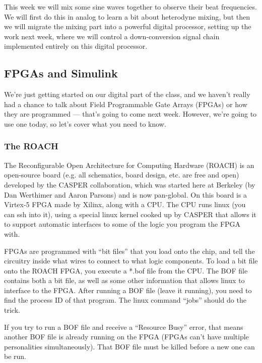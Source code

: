 \documentclass[11pt]{article}
\begin{document}
This week we will mix some sine waves together to observe their beat frequencies.  We will first do this
in analog to learn a bit about heterodyne mixing, but then we will migrate the mixing part into a powerful
digital processor, setting up the work next week, where we will control a down-conversion signal
chain implemented entirely on this digital processor.

\subsection*{FPGAs and Simulink}

We're just getting started on our digital part of the class, and we haven't really had a chance to talk
about Field Programmable Gate Arrays (FPGAs) or how they are programmed --- that's going to come next
week.  However, we're going to use one today, so let's cover what you need to know.

\subsubsection*{The ROACH}

The Reconfigurable Open Architecture for Computing Hardware (ROACH) is an open-source board (e.g.
all schematics, board design, etc. are free and open) developed by the CASPER collaboration, which
was started here at Berkeley (by Dan Werthimer and Aaron Parsons) and is now pan-global.  
On this board is a Virtex-5 FPGA made by Xilinx, along with a CPU.  The CPU
runs linux (you can ssh into it), using a special linux kernel cooked up by CASPER that allows it to support 
automatic interfaces to some of the logic you program the FPGA with.

FPGAs are programmed with ``bit files'' that you load onto the chip, and tell the circuitry inside what
wires to connect to what logic components.  To load a bit file onto the ROACH FPGA, you execute a *.bof file
from the CPU.  The BOF file contains both a bit file, as well as some other information that allows
linux to interface to the FPGA.  After running a BOF file (leave it running), you need to find the 
process ID of that program.  The linux command ``jobs'' should do the trick.

If you try to run a BOF file and receive a ``Resource Busy'' error, that means another BOF file is
already running on the FPGA (FPGAs can't have multiple personalities simultaneously).  That BOF file
must be killed before a new one can be run.
\end{document}
